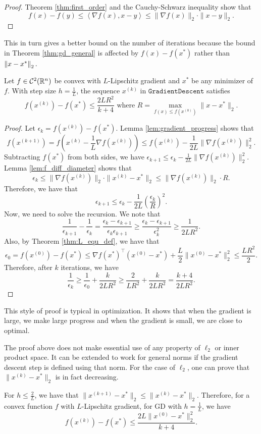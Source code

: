 \begin{proof}
Theorem \ref{thm:first_order} and the Cauchy-Schwarz inequality show
that 
\[
f(x)-f(y)\leq\left\langle \nabla f(x),x-y\right\rangle \leq\|\nabla f(x)\|_{2}\cdot\|x-y\|_{2}.
\]
\end{proof}
This in turn gives a better bound on the number of iterations because
the bound in Theorem \ref{thm:gd_general} is affected by $f(x)-f(x^{*})$
rather than $\left\Vert x-x^{*}\right\Vert_{2}.$
\begin{thm}
\label{thm:gd_convex}Let $f\in\mathcal{C}^{2}(\mathbb{R}^{n})$ be convex
with $L$-Lipschitz gradient and $x^{*}$ be any minimizer of $f$.
With step size $h=\frac{1}{L}$, the sequence $x^{(k)}$ in $\mathtt{GradientDescent}$
satisfies
\[
f(x^{(k)})-f(x^{*})\leq\frac{2LR^{2}}{k+4}\text{ where }R=\max_{f(x)\leq f(x^{(0)})}\|x-x^{*}\|_{2}.
\]
\end{thm}

\begin{proof}
Let $\epsilon_{k}=f(x^{(k)})-f(x^{*})$. Lemma \ref{lem:gradient_progress}
shows that
\[
f(x^{(k+1)})=f(x^{(k)}-\frac{1}{L}\nabla f(x^{(k)}))\leq f(x^{(k)})-\frac{1}{2L}\|\nabla f(x^{(k)})\|^{2}_{2}.
\]
Subtracting $f(x^{*})$ from both sides, we have $\epsilon_{k+1}\leq\epsilon_{k}-\frac{1}{2L}\|\nabla f(x^{(k)})\|^{2}_{2}$.
Lemma \ref{lem:f_diff_diameter} shows that 
\[
\epsilon_{k}\leq\|\nabla f(x^{(k)})\|_{2}\cdot\|x^{(k)}-x^{*}\|_{2}\leq\|\nabla f(x^{(k)})\|_{2}\cdot R.
\]
Therefore, we have that
\[
\epsilon_{k+1}\leq\epsilon_{k}-\frac{1}{2L}\left(\frac{\epsilon_{k}}{R}\right)^{2}.
\]
Now, we need to solve the recursion. We note that
\[
\frac{1}{\epsilon_{k+1}}-\frac{1}{\epsilon_{k}}=\frac{\epsilon_{k}-\epsilon_{k+1}}{\epsilon_{k}\epsilon_{k+1}}\geq\frac{\epsilon_{k}-\epsilon_{k+1}}{\epsilon^{2}_{k}}\geq\frac{1}{2LR^{2}}.
\]
Also, by Theorem \ref{thm:L_equ_def}, we have that 
\[
\epsilon_{0}=f(x^{(0)})-f(x^{*})\leq\nabla f(x^{*})^{\top}(x^{(0)}-x^{*})+\frac{L}{2}\|x^{(0)}-x^{*}\|^{2}_{2}\leq\frac{LR^{2}}{2}.
\]
Therefore, after $k$ iterations, we have
\[
\frac{1}{\epsilon_{k}}\geq\frac{1}{\epsilon_{0}}+\frac{k}{2LR^{2}}\geq\frac{2}{LR^{2}}+\frac{k}{2LR^{2}}=\frac{k+4}{2LR^{2}}.
\]
\end{proof}
This style of proof is typical in optimization. It shows that when
the gradient is large, we make large progress and when the gradient
is small, we are close to optimal. 

The proof above does not make essential use of any property of $\ell_{2}$
or inner product space. It can be extended to work for general norms
if the gradient descent step is defined using that norm. For the case
of $\ell_{2}$, one can prove that $\|x^{(k)}-x^{*}\|_{2}$ is in
fact decreasing. 
\begin{lem}
For $h\leq\frac{2}{L}$, we have that $\|x^{(k+1)}-x^{*}\|_{2}\leq\|x^{(k)}-x^{*}\|_{2}$.
Therefore, for a convex function $f$ with $L$-Lipschitz gradient,
for GD with $h=\frac{1}{L}$, we have
\[
f(x^{(k)})-f(x^{*})\leq\frac{2L\|x^{(0)}-x^{*}\|^{2}_{2}}{k+4}.
\]
\end{lem}

